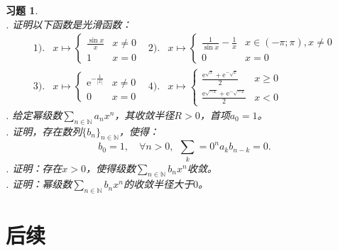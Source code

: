 \documentclass[12pt,UTF8]{ctexbook}
\theoremstyle{definition}
\theoremstyle{plain}
\newtheorem{xt}{习题}[section]
\begin{document}
\begin{appendix}
\begin{xt}
    \mbox{} \\
    . 证明以下函数是光滑函数：
    \begin{align*}
        1).& 
        x \mapsto \begin{cases}
            \frac{\sin{x}}{x} & x\neq 0 \\
            1 & x = 0 
        \end{cases}
        &2).&
        x \mapsto \begin{cases}
            \frac{1}{\sin{x}} - \frac{1}{x} & x\in (-\pi;\pi), x\neq 0 \\
            0 & x = 0 
        \end{cases} \\
        3).& 
        x \mapsto \begin{cases}
            \mathrm{e}^{-\frac{1}{|x|}} & x\neq 0 \\
            0 & x = 0 
        \end{cases}
        &4).&
        x \mapsto \begin{cases}
            \frac{\mathrm{e}^{\sqrt{x}} + \mathrm{e}^{-\sqrt{x}}}{2} & x\geqslant 0 \\
            \frac{\mathrm{e}^{\sqrt{-x}} + \mathrm{e}^{-\sqrt{-x}}}{2} & x < 0 
        \end{cases}
    \end{align*}
    . 给定幂级数$\sum_{n\in\mathbb{N}} a_n x^n$，其收敛半径$R>0$，首项$a_0=1$。\\
    . 证明，存在数列$\{b_n\}_{n\in\mathbb{N}}$，使得：
    $$
    b_0 = 1, \quad \forall n > 0, \;\, \sum_k=0^n a_k b_{n-k} = 0.
    $$
    . 证明：存在$x>0$，使得级数$\sum_{n\in\mathbb{N}} b_n x^n$收敛。\\
    . 证明：幂级数$\sum_{n\in\mathbb{N}} b_n x^n$的收敛半径大于$0$。
\end{xt}


\chapter{后续}

\end{appendix}
\end{document}
